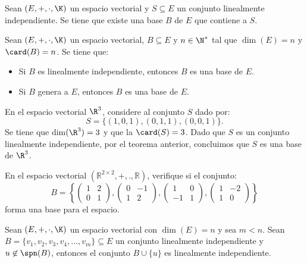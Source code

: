 \documentclass[compacto,10pt]{pubciencias-notas}
\begin{document}
\begin{prop}
Sean $(E,+,\cdot,\K)$ un espacio vectorial y $S\subseteq E$ un conjunto linealmente independiente. Se tiene que existe una base $B$ de $E$ que contiene a $S$.
\end{prop}

\begin{teo}
    Sean $(E,+,\cdot,\K)$ un espacio vectorial, $B\subseteq E$ y $n\in\N^*$ tal que $\dim(E)=n$ y $\card(B)=n$. Se tiene que:
    \begin{itemize}
    \item
        Si $B$ es linealmente independiente, entonces $B$ es una base de $E$.
    \item
        Si $B$ genera a $E$, entonces $B$ es una base de $E$.
    \end{itemize}
\end{teo}

\begin{ejem}\hspace{0pt}
En el espacio vectorial $\R^{3}$, considere al conjunto $S$ dado por:
\[
    S = \{(1, 0, 1), (0, 1, 1),(0, 0, 1)\}.
\]
Se tiene que dim$(\R^{3})=3$ y que la $\card(S)=3$.
Dado que $S$ es un conjunto linealmente independiente, por el teorema anterior, concluimos que $S$ es una base de $\R^{3}$.
\end{ejem}

\begin{ejer}\hspace{0pt}
En el espacio vectorial $(\mathbb{R}^{2\times 2}, +, ., \mathbb{R})$, verifique si el conjunto:
\[B=\left\{\begin{pmatrix} 1 & 2\\ 0 & 1\end{pmatrix}, \begin{pmatrix} 0 & -1\\ 1 & 2\end{pmatrix}, \begin{pmatrix} 1 & 0\\ -1 & 1\end{pmatrix}, \begin{pmatrix} 1 & -2\\ 1 & 0\end{pmatrix}  \right\}\]
forma una base para el espacio.
\end{ejer}


\begin{teo}
Sean $(E,+,\cdot,\K)$ un espacio vectorial con $\dim(E)=n$ y sea $m<n$. Sean $B=\{v_1, v_2, v_3, v_4, \dots, v_m\}\subseteq E$ un conjunto linealmente independiente y $u\not\in \spn(B)$, entonces el conjunto $B \cup \{u\} $ es linealmente independiente.
\end{teo}
\end{document}

